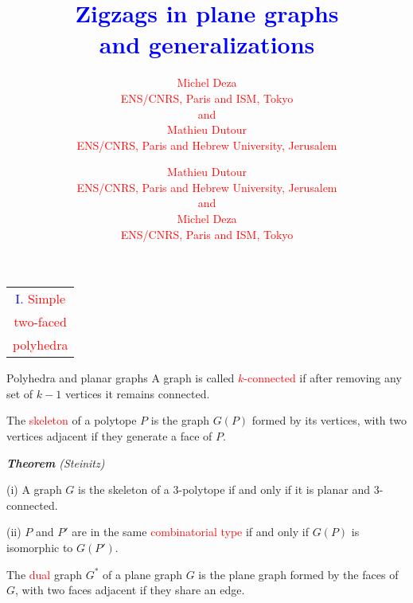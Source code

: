 \documentclass[%
pdf,
colorBG,
slideColor,
]{prosper}
\title{\Huge \textcolor{blue}{Zigzags in plane graphs}\\[3mm]
\textcolor{blue}{and generalizations}}
\author{
\textcolor{red}{\Large Michel Deza}\\[2mm]
\textcolor{red}{\large ENS/CNRS, Paris and ISM, Tokyo}\\[2mm]
\textcolor{red}{and}\\[2mm]
\textcolor{red}{\Large Mathieu Dutour}\\[2mm]
\textcolor{red}{\large ENS/CNRS, Paris and Hebrew University, Jerusalem}\\[2mm]
}
\author{
\textcolor{red}{\Large Mathieu Dutour}\\[2mm]
\textcolor{red}{\large ENS/CNRS, Paris and Hebrew University, Jerusalem}\\[2mm]
\textcolor{red}{and}\\[2mm]
\textcolor{red}{\Large Michel Deza}\\[2mm]
\textcolor{red}{\large ENS/CNRS, Paris and ISM, Tokyo}\\[2mm]
}
\date{}
\begin{document}
\maketitle




\begin{slide}{}
\begin{center}
{\Huge 
\begin{tabular*}{5cm}{c}
\\[-0.5cm]
\textcolor{blue}{I. }\textcolor{red}{Simple}\\
\textcolor{red}{two-faced}\\
\textcolor{red}{polyhedra}
\end{tabular*}
}
\end{center}
\end{slide}




\begin{slide}{Polyhedra and planar graphs}
A graph is called \textcolor{red}{$k$-connected} if after removing any set of $k-1$ vertices it remains connected.

\vspace{2mm}

The \textcolor{red}{skeleton} of a polytope $P$ is the graph $G(P)$ formed by its vertices, with two vertices adjacent if they generate a face of $P$.

\vspace{3mm}

{\em {\bf Theorem} (Steinitz)

(i) A graph $G$ is the skeleton of a $3$-polytope if and only if it is planar and $3$-connected.

(ii) $P$ and $P'$ are in the same \textcolor{red}{combinatorial type} if and only if $G(P)$ is isomorphic to $G(P')$.
}

\vspace{3mm}

The \textcolor{red}{dual} graph $G^*$ of a plane graph $G$ is the plane graph formed by the faces of $G$, with two faces adjacent if they share an edge.


\end{slide}
\end{document}
